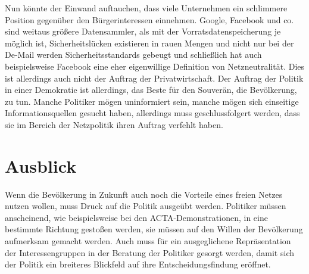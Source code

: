 \documentclass[
	12pt,
	a4paper,
	BCOR10mm,
	DIV14,
	listof=totoc,
	bibliography=totoc,
	headsepline
]{scrreprt}
\begin{document}
Nun könnte der Einwand auftauchen, dass viele Unternehmen ein schlimmere Position gegenüber den Bürgerinteressen einnehmen.
Google, Facebook und co. sind weitaus größere Datensammler, als mit der Vorratsdatenspeicherung je möglich ist, Sicherheitslücken existieren in rauen Mengen und nicht nur bei der De-Mail werden Sicherheitsstandards gebeugt und schließlich hat auch beispielsweise Facebook eine eher eigenwillige Definition von Netzneutralität. 
Dies ist allerdings auch nicht der Auftrag der Privatwirtschaft.
Der Auftrag der Politik in einer Demokratie ist allerdings, das Beste für den Souverän, die Bevölkerung, zu tun.
Manche Politiker mögen uninformiert sein, manche mögen sich einseitige Informationsquellen gesucht haben, allerdings muss geschlussfolgert werden, dass sie im Bereich der Netzpolitik ihren Auftrag verfehlt haben.


\section{Ausblick}
\label{lookout}
Wenn die Bevölkerung in Zukunft auch noch die Vorteile eines freien Netzes nutzen wollen, muss Druck auf die Politik ausgeübt werden.
Politiker müssen anscheinend, wie beispielsweise bei den ACTA-Demonstrationen, in eine bestimmte Richtung gestoßen werden, sie müssen auf den Willen der Bevölkerung aufmerksam gemacht werden.
Auch muss für ein ausgeglichene Repräsentation der Interessengruppen in der Beratung der Politiker gesorgt werden, damit sich der Politik ein breiteres Blickfeld auf ihre Entscheidungsfindung eröffnet.


\nocite{*}




\end{document}
